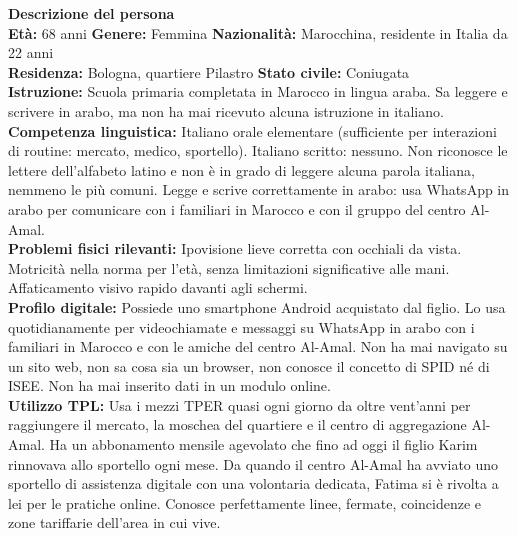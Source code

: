 ﻿\documentclass[11pt,a4paper]{article}
\begin{document}
\begin{center}
\vspace{0.3cm}


\begin{tcolorbox}[base]
    \textbf{Descrizione del persona} \\[4pt]
    {\small
    \textbf{Età:} 68 anni \hfill
    \textbf{Genere:} Femmina \hfill
    \textbf{Nazionalità:} Marocchina, residente in Italia da 22 anni
    \\[2pt]
    \textbf{Residenza:} Bologna, quartiere Pilastro \hfill
    \textbf{Stato civile:} Coniugata \\[2pt]
    \textbf{Istruzione:} Scuola primaria completata in Marocco
    in lingua araba. Sa leggere e scrivere in arabo,
    ma non ha mai ricevuto alcuna istruzione in italiano. \\[2pt]
    \textbf{Competenza linguistica:} Italiano orale elementare
    (sufficiente per interazioni di routine: mercato, medico,
    sportello). Italiano scritto: nessuno. Non riconosce le
    lettere dell'alfabeto latino e non è in grado di leggere
    alcuna parola italiana, nemmeno le più comuni.
    Legge e scrive correttamente in arabo: usa WhatsApp
    in arabo per comunicare con i familiari in Marocco
    e con il gruppo del centro Al-Amal. \\[2pt]
    \textbf{Problemi fisici rilevanti:} Ipovisione lieve
    corretta con occhiali da vista. Motricità nella norma
    per l'età, senza limitazioni significative alle mani.
    Affaticamento visivo rapido davanti agli schermi. \\[2pt]
    \textbf{Profilo digitale:} Possiede uno smartphone Android
    acquistato dal figlio. Lo usa quotidianamente per
    videochiamate e messaggi su WhatsApp in arabo con
    i familiari in Marocco e con le amiche del centro Al-Amal.
    Non ha mai navigato su un sito web, non sa cosa sia
    un browser, non conosce il concetto di SPID né di ISEE.
    Non ha mai inserito dati in un modulo online. \\[2pt]
    \textbf{Utilizzo TPL:} Usa i mezzi TPER quasi ogni giorno
da oltre vent'anni per raggiungere il mercato, la moschea
del quartiere e il centro di aggregazione Al-Amal.
Ha un abbonamento mensile agevolato che fino ad oggi
il figlio Karim rinnovava allo sportello ogni mese.
Da quando il centro Al-Amal ha avviato uno sportello
di assistenza digitale con una volontaria dedicata,
Fatima si è rivolta a lei per le pratiche online.
Conosce perfettamente linee, fermate, coincidenze
e zone tariffarie dell'area in cui vive.
    }
\end{tcolorbox}


\end{center}
\end{document}
